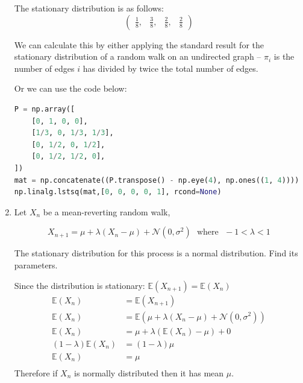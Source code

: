 \documentclass[10pt,\jkfside,a4paper]{article}
\begin{document}
\begin{enumerate}
The stationary distribution is as follows:
\[
\begin{pmatrix}
\frac{1}{8}, &
\frac{3}{8}, &
\frac{2}{8}, &
\frac{2}{8}
\end{pmatrix}
\]

We can calculate this by either applying the standard result for the
stationary distribution of a random walk on an undirected graph -- $\pi_i$ is
the number of edges $i$ has divided by twice the total number of edges.

Or we can use the code below:
\begin{lstlisting}[language=Python]
P = np.array([
	[0, 1, 0, 0],
	[1/3, 0, 1/3, 1/3],
	[0, 1/2, 0, 1/2],
	[0, 1/2, 1/2, 0],
])
mat = np.concatenate((P.transpose() - np.eye(4), np.ones((1, 4))))
np.linalg.lstsq(mat,[0, 0, 0, 0, 1], rcond=None)
\end{lstlisting}

\item Let $X_n$ be a mean-reverting random walk,

\[
X_{n + 1} = \mu + \lambda(X_n - \mu) + \mathcal{N}(0, \sigma^2) \ \ \
\text{where} \ \ \ -1 < \lambda < 1
\]

The stationary distribution for this process is a normal distribution. Find
its parameters.

Since the distribution is stationary: $\mathbb{E}(X_{n+1}) = \mathbb{E}(X_n)$
\[
\begin{split}
\mathbb{E}(X_n) &= \mathbb{E}(X_{n+1}) \\
\mathbb{E}(X_n) &= \mathbb{E}(\mu + \lambda(X_n - \mu) + \mathcal{N}(0,
\sigma^2)) \\
\mathbb{E}(X_n) &= \mu + \lambda(\mathbb{E}(X_n) - \mu) + 0 \\
(1 - \lambda)\mathbb{E}(X_n) &= (1 - \lambda)\mu \\
\mathbb{E}(X_n) &= \mu \\
\end{split}
\]
Therefore if $X_n$ is normally distributed then it has mean $\mu$.


\end{enumerate}
\end{document}
